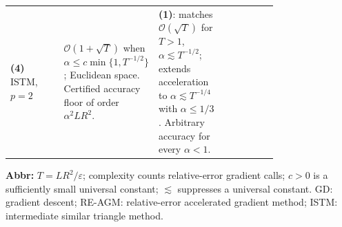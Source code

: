 \begin{table}[tp]
\begin{threeparttable}
\begin{tabularx}{\linewidth}{@{}>{\raggedright\arraybackslash}p{0.20\linewidth}>{\raggedright\arraybackslash}p{0.32\linewidth}>{\raggedright\arraybackslash}p{0.25\linewidth}>{\raggedright\arraybackslash}X@{}}
& \\
\midrule
\textbf{(4)} ISTM, $p=2$ \citep[Thm.~3.1]{rescKornilov2023v1}
& $\mathcal{O}(1+\sqrt T)$ when $\alpha\le c\min\{1,T^{-1/2}\}$; Euclidean space. Certified accuracy floor of order $\alpha^2LR^2$.
& \textbf{(1)}: matches $\mathcal{O}(\sqrt T)$ for $T>1$, $\alpha\lesssim T^{-1/2}$; extends acceleration to $\alpha\lesssim T^{-1/4}$ with $\alpha\le1/3$. Arbitrary accuracy for every $\alpha<1$.
& \\
\bottomrule
\end{tabularx}
\begin{tablenotes}[flushleft]\footnotesize
\item[] \textbf{Abbr:} $T=LR^2/\varepsilon$; complexity counts relative-error gradient calls; $c>0$ is a sufficiently small universal constant; $\lesssim$ suppresses a universal constant. GD: gradient descent; RE-AGM: relative-error accelerated gradient method; ISTM: intermediate similar triangle method.
\end{tablenotes}
\end{threeparttable}
\end{table}
\clearpage
